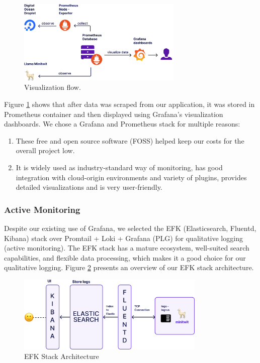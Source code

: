 \documentclass{article}
\begin{document}
\begin{figure}[ht]
    \centering
    \includegraphics[width=0.7\textwidth]{./images/flow_grafana_prometheus_v2.png} 
    \caption{Visualization flow.}
    \label{fig:visualization_flow}
\end{figure}

Figure \ref{fig:visualization_flow} shows that after data was scraped from our application, it was stored in Prometheus container and then displayed using Grafana's visualization dashboards. We chose a Grafana and Prometheus stack for multiple reasons:

\begin{enumerate}
    \item These free and open source software (FOSS) helped keep our costs for the overall project low.
    \item It is widely used as industry-standard way of monitoring, has good integration with cloud-origin environments and variety of plugins, provides detailed visualizations and is very user-friendly.
\end{enumerate}

\subsubsection{Active Monitoring}
Despite our existing use of Grafana, we selected the EFK (Elasticsearch, Fluentd, Kibana) stack over Promtail + Loki + Grafana (PLG) for qualitative logging (active monitoring). The EFK stack has a mature ecosystem, well-suited search capabilities, and flexible data processing, which makes it a good choice for our qualitative logging. Figure \ref{fig:efk_stack} presents an overview of our EFK stack architecture.

\begin{figure}[ht]
    \centering
    \includegraphics[width=0.8\textwidth]{./images/EFK_stack.png} 
    \caption{EFK Stack Architecture}
    \label{fig:efk_stack}
\end{figure}
\end{document}
